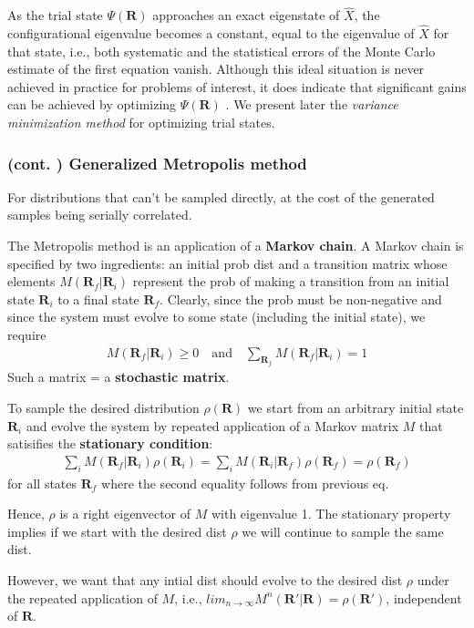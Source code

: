 \documentclass[twoside,english]{uiofysmaster}
\begin{document}
As the trial state $\Psi(\bm{R})$ approaches an exact eigenstate of $\hat{X}$, the configurational eigenvalue becomes a constant, equal to the eigenvalue of $\hat{X}$ for that state, i.e., both systematic and the statistical errors of the Monte Carlo estimate of the first equation vanish. Although this ideal situation is never achieved in practice for problems of interest, it does indicate that significant gains can be achieved by optimizing $\Psi(\bm{R})$ . We present later the \textit{variance minimization method} for optimizing trial states.
\subsubsection{(cont. ) Generalized Metropolis method}
For distributions that can't be sampled directly, at the cost of the generated samples being serially correlated.

The Metropolis method is an application of a \textbf{Markov chain}. A Markov chain is specified by two ingredients: an initial prob dist and a transition matrix whose elements $M(\bm{R}_f | \bm{R}_i )$ represent the prob of making a transition from an initial state $\bm{R}_i$ to a final state $\bm{R}_f$. Clearly, since the prob must be non-negative and since the system must evolve to some state (including the initial state), we require
\begin{align}
	M(\bm{R}_f | \bm{R}_i) \geq 0 \quad \text{and} \quad
	\sum_{\bm{R}_f} M(\bm{R}_f | \bm{R}_i) = 1
\end{align}
Such a matrix = a \textbf{stochastic matrix}.

To sample the desired distribution $\rho (\bm{R})$ we start from an arbitrary initial state $\bm{R}_i$ and evolve the system by repeated application of a Markov matrix $M$ that satisifies the \textbf{stationary condition}:
\begin{align}
	\sum_i M(\bm{R}_f | \bm{R}_i) \rho (\bm{R}_i) = \sum_i M (\bm{R}_i | \bm{R}_f) \rho(\bm{R}_f) = \rho(\bm{R}_f)
\end{align}
for all states $\bm{R}_f$ where the second equality follows from previous eq. 

Hence, $\rho$ is a right eigenvector of $M$ with eigenvalue 1. The stationary property implies if we start with the desired dist $\rho$ we will continue to sample the same dist. 

However, we want that any intial dist should evolve to the desired dist $\rho$ under the repeated application of $M$, i.e., $lim_{n\rightarrow \infty} M^n (\bm{R}' | \bm{R}) = \rho(\bm{R}')$, independent of $\bm{R}$. 
\end{document}

